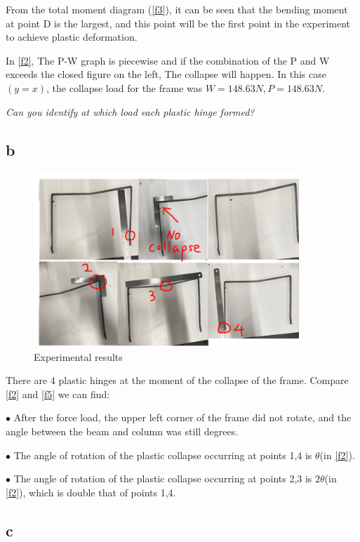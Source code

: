 From the total moment diagram (\autoref{f3}), it can be seen that the bending moment at point D is the largest, and this point will be the first point in the experiment to achieve plastic deformation.

In \autoref{f2}, The P-W graph is piecewise and if the combination of the P and W exceeds the closed figure on the left, The collapse will happen. In this case$(y=x)$, the collapse load for the frame was $W=148.63N,P=148.63N$.

\textit{Can you identify at which load each plastic hinge formed?}


\subsection*{b}

\begin{figure}[htbp]
    \centering
    \includegraphics[width=10cm]{./fig/18.jpg}
    \caption{Experimental results}
    \label{f5}
\end{figure}

There are 4 plastic hinges at the moment of the collapse of the frame. Compare \autoref{f2} and \autoref{f5} we can find: 

$\bullet$ After the force load, the upper left corner of the frame did not rotate, and the angle between the beam and column was still degrees.

$\bullet$ The angle of rotation of the plastic collapse occurring at points 1,4 is $\theta$(in \autoref{f2}).

$\bullet$ The angle of rotation of the plastic collapse occurring at points 2,3 is $2\theta$(in \autoref{f2}), which is double that of points 1,4.

\subsection*{c}
